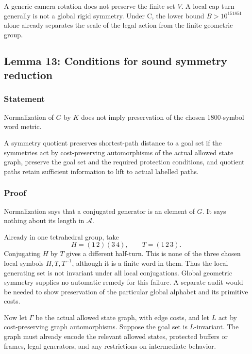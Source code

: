 \documentclass[
  10pt,
  a4paper,
]{article}
\newcounter{none} %
\begin{document}
A generic camera rotation does not preserve the finite set \(V\). A
local cap turn generally is not a global rigid symmetry. Under C, the
lower bound \(B>10^{151851}\) alone already separates the scale of the
legal action from the finite geometric group.

\subsection{Lemma 13: Conditions for sound symmetry
reduction}\label{lemma-13-conditions-for-sound-symmetry-reduction}

\subsubsection{Statement}\label{statement-12}

Normalization of \(G\) by \(K\) does not imply preservation of the
chosen \(1800\)-symbol word metric.

A symmetry quotient preserves shortest-path distance to a goal set if
the symmetries act by cost-preserving automorphisms of the actual
allowed state graph, preserve the goal set and the required protection
conditions, and quotient paths retain sufficient information to lift to
actual labelled paths.

\subsubsection{Proof}\label{proof-12}

Normalization says that a conjugated generator is an element of \(G\).
It says nothing about its length in \(\mathcal A\).

Already in one tetrahedral group, take \begin{equation}
H=(1\,2)(3\,4),\qquad T=(1\,2\,3).
\end{equation} Conjugating \(H\) by \(T\) gives a different half-turn.
This is none of the three chosen local symbols \(H,T,T^{-1}\), although
it is a finite word in them. Thus the local generating set is not
invariant under all local conjugations. Global geometric symmetry
supplies no automatic remedy for this failure. A separate audit would be
needed to show preservation of the particular global alphabet and its
primitive costs.

Now let \(\Gamma\) be the actual allowed state graph, with edge costs,
and let \(L\) act by cost-preserving graph automorphisms. Suppose the
goal set is \(L\)-invariant. The graph must already encode the relevant
allowed states, protected buffers or frames, legal generators, and any
restrictions on intermediate behavior.
\end{document}

